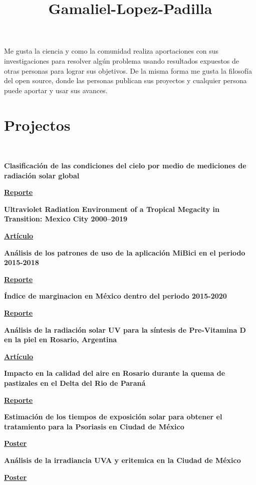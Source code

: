 \documentclass[a3paper]{adcv_color}
\title{Gamaliel-Lopez-Padilla}
\newcommand{\proyect}[5]{\begin{minipage}{1\linewidth}
		\begin{minipage}{1\linewidth}
			\textbf{#1}
		\end{minipage}
	\end{minipage}
	\href{#4}{\textbf{#5}}
	\vspace{0.05cm}\\
}
\begin{document}
\changefontsizes{16pt}

Me gusta la ciencia y como la comunidad realiza  aportaciones con sus investigaciones para resolver algún problema usando resultados expuestos de otras personas para lograr sus objetivos. De la misma forma me gusta la filosofía del open source, donde las personas publican sus proyectos y cualquier persona puede aportar y usar sus avances.

\section{Projectos}\\

\proyect{Clasificación de las condiciones del cielo por medio de mediciones de radiación solar global}{Junio 2022}{-0.8}{https://github.com/giovannilopez9808/Cloud_classification/raw/main/Document/Main.pdf}{Reporte}

\proyect{Ultraviolet Radiation Environment of a Tropical Megacity in Transition: Mexico City 2000–2019}{Agosto 2021}{-0.6}{https://pubs.acs.org/doi/10.1021/acs.est.0c08515}{Artículo}

\proyect{Análisis de los patrones de uso de la aplicación MiBici en el periodo 2015-2018}{Noviembre 2021}{-0.2}{https://raw.githubusercontent.com/giovannilopez9808/MiBici/main/Document/Main.pdf}{Reporte}

\proyect{Índice de marginacion en México dentro del periodo 2015-2020}{Octubre 2021}{-0.2}{https://raw.githubusercontent.com/giovannilopez9808/IndiceDeMarginacion2015_2020/main/Document/Main.pdf}{Reporte}

\proyect{Análisis de la radiación solar UV para la síntesis de Pre-Vitamina D en la piel en Rosario, Argentina}{Enero 2022}{-0.8}{https://anales.fisica.org.ar/journal/index.php/analesafa/article/view/2318}{Artículo}

\proyect{Impacto en la calidad del aire en Rosario durante la quema de pastizales en el Delta del Rio de Paraná}{Agosto 2022}{-0.6}{https://rephip.unr.edu.ar/handle/2133/24201}{Reporte}

\proyect{Estimación de los tiempos de exposición solar para obtener el tratamiento para la Psoriasis en Ciudad de México}{Agosto 2020}{-0.2}{https://github.com/giovannilopez9808/Documents/raw/master/Posters/2020/CNF/TES/main.pdf}{Poster}

\proyect{Análisis de la irradiancia UVA y eritemica en la Ciudad de México}{Octubre 2019}{-0.2}{https://github.com/giovannilopez9808/Documents/raw/master/Posters/2019/AFA/Analisis\%20indice\%20UV/Analisis\%20de\%20irradiancia.pdf}{Poster}
\end{document}
